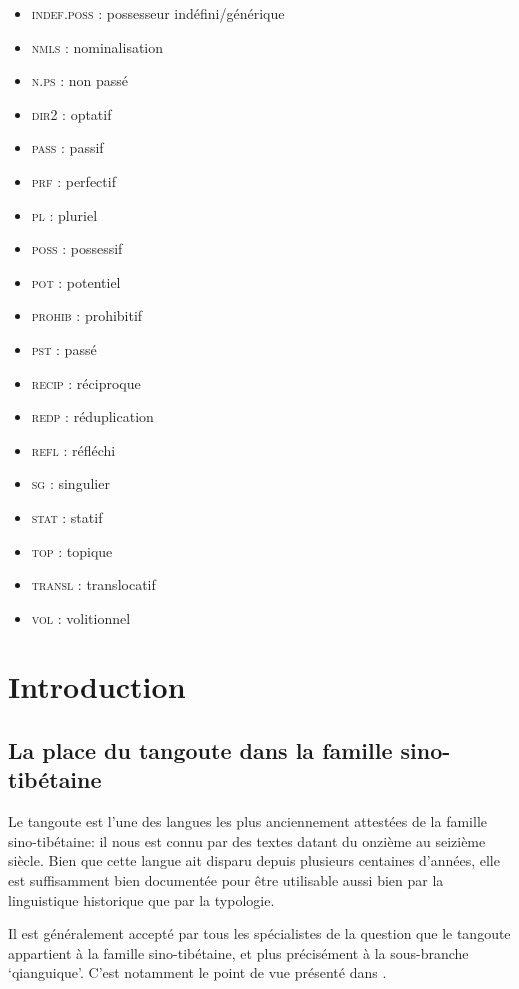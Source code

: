 \documentclass[oldfontcommands,twoside,a4paper,11pt,draft]{memoir}
\newcommand{\neu}{\textsc{indef.poss}}
\newcommand{\nmls}{\textsc{nmls}}
\newcommand{\nonps}{\textsc{n.ps}}
\newcommand{\opt}{\textsc{dir2}}
\newcommand{\pass}{\textsc{pass}}
\newcommand{\perf}{\textsc{prf}}
\newcommand{\pl}{\textsc{pl}}
\newcommand{\poss}{\textsc{poss}}
\newcommand{\pot}{\textsc{pot}}
\newcommand{\prohib}{\textsc{prohib}}
\newcommand{\ps}{\textsc{pst}}
\newcommand{\recip}{\textsc{recip}}
\newcommand{\redp}{\textsc{redp}}
\newcommand{\refl}{\textsc{refl}}
\newcommand{\sg}{\textsc{sg}}
\newcommand{\stat}{\textsc{stat}}
\newcommand{\topic}{\textsc{top}}
\newcommand{\transl}{\textsc{transl}}
\newcommand{\volit}{\textsc{vol}}
\begin{document}
\begin{multicols}{2}
\begin{itemize}
\item \neu{} : possesseur indéfini/générique
\item \nmls{} : nominalisation
\item \nonps{} : non passé
\item \opt{} : optatif
\item \pass{} : passif
\item \perf{} : perfectif
\item \pl{} : pluriel
\item \poss{} : possessif
\item \pot{} : potentiel
\item \prohib{} : prohibitif
\item \ps{} : passé
\item \recip{} : réciproque
\item \redp{} : réduplication
\item \refl{} : réfléchi
\item \sg{} : singulier
\item \stat{} : statif
\item \topic{} : topique
\item \transl{} : translocatif
\item \volit{} : volitionnel
\end{itemize}
  \end{multicols}


\chapter{Introduction} 
\thispagestyle{empty}
 \setcounter{page}{1}
\section{La place du tangoute dans la famille sino-tibétaine}
Le tangoute est l'une des langues les plus anciennement attestées de la famille sino-tibétaine: il   nous est connu par des textes datant du onzième au seizième siècle. Bien que cette langue ait disparu depuis plusieurs centaines d'années, elle est suffisamment bien documentée pour être utilisable aussi bien par la linguistique historique que par la typologie.

Il est généralement accepté par tous les spécialistes de la question que le tangoute appartient à la famille sino-tibétaine, et plus précisément à la sous-branche `qianguique'. C'est notamment le point de vue présenté dans \citet{lifw99bijiao}. 
\end{document}
